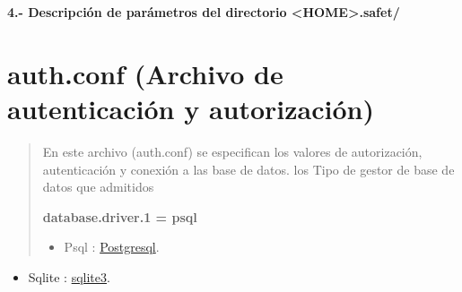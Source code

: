 \documentclass[letterpaper,11pt,spanish]{sphinxmanual}
\begin{document}
\textbf{4.- Descripción de parámetros del directorio \textless{}HOME\textgreater{}.safet/}


\chapter{\textbf{auth.conf} (Archivo de autenticación y autorización)}
\label{_templates/Contenido2/libsafet_auth_conft:auth-conf-archivo-de-autenticacion-y-autorizacion}\label{_templates/Contenido2/libsafet_auth_conft::doc}\begin{quote}

En este archivo (auth.conf) se especifican los valores de autorización, autenticación y conexión a las base de datos. los Tipo de gestor de base de datos que admitidos

\textbf{database.driver.1 = psql}
\begin{itemize}
\item {} 
Psql : \href{http://www.postgresql.org/}{Postgresql}.

\end{itemize}
\end{quote}
\begin{itemize}
\item {} 
Sqlite : \href{http://www.sqlite.org/}{sqlite3}.

\end{itemize}
\end{document}
